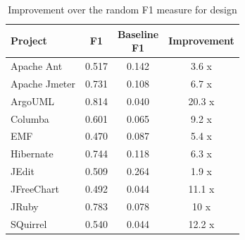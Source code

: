 \begin{table}[!hbt]
    \begin{center}
        \caption{Improvement over the random F1 measure for design}
        \label{tbl:improvement_f1measure_design}
        \begin{tabular}{l| c c c }
        \toprule
        \textbf{Project} & \textbf{F1} & \thead{Baseline\\F1} & \textbf{Improvement}\\
        \midrule
         Apache Ant      &  0.517 &  0.142  &  3.6  x\\
         Apache Jmeter   &  0.731 &  0.108  &  6.7  x\\
         ArgoUML         &  0.814 &  0.040  &  20.3 x\\
         Columba         &  0.601 &  0.065  &  9.2  x\\
         EMF             &  0.470 &  0.087  &  5.4  x\\
         Hibernate       &  0.744 &  0.118  &  6.3  x\\
         JEdit           &  0.509 &  0.264  &  1.9  x\\
         JFreeChart      &  0.492 &  0.044  &  11.1 x\\
         JRuby           &  0.783 &  0.078  &  10   x\\
         SQuirrel        &  0.540 &  0.044  &  12.2 x\\
        \bottomrule
        \end{tabular}
    \end{center}    
\end{table}

